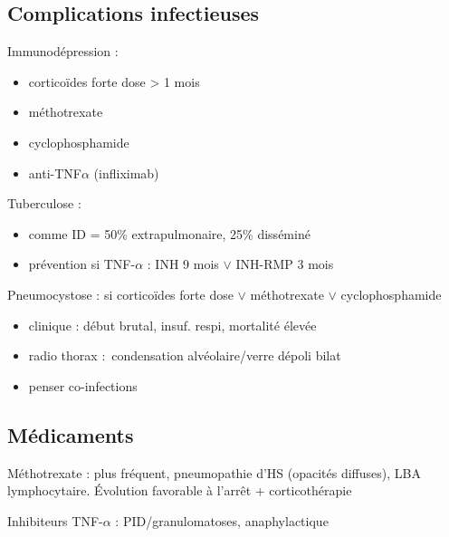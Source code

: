 \documentclass{article}
\begin{document}
\subsection{Complications infectieuses}
Immunodépression :
\begin{itemize}
  \item corticoïdes forte dose > 1 mois
  \item méthotrexate
  \item cyclophosphamide
  \item anti-TNF$\alpha$ (infliximab)
\end{itemize}
Tuberculose : 
\begin{itemize}
  \item comme ID = 50\% extrapulmonaire, 25\% disséminé
  \item prévention si TNF-$\alpha$ : INH 9 mois $\vee$ INH-RMP 3 mois
\end{itemize}
Pneumocystose : si corticoïdes forte dose $\vee$ méthotrexate $\vee$
cyclophosphamide
\begin{itemize}
  \item clinique : début brutal, insuf. respi, mortalité élevée
  \item radio thorax : condensation alvéolaire/verre dépoli bilat
  \item penser co-infections
\end{itemize}
\subsection{Médicaments}
Méthotrexate : plus fréquent, pneumopathie d'HS (opacités diffuses), LBA
lymphocytaire. Évolution favorable à l'arrêt + corticothérapie

Inhibiteurs TNF-$\alpha$ : PID/granulomatoses, anaphylactique
\end{document}
